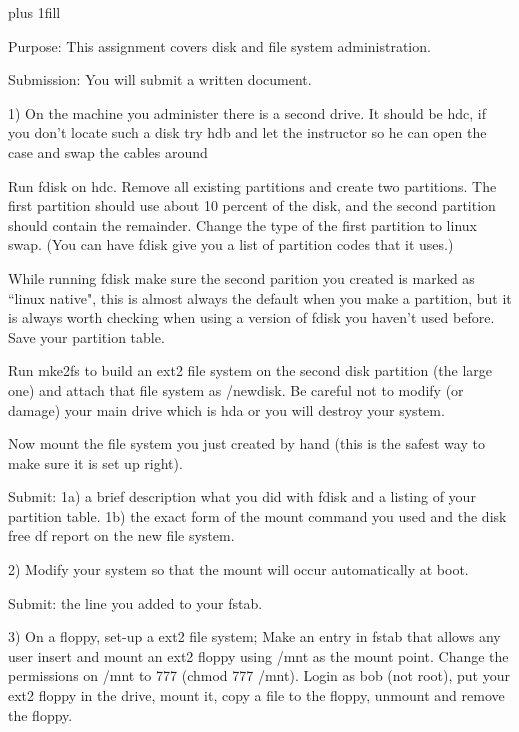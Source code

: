 
\rightskip=0pt plus 1fill

\parindent 0pt

Purpose: This assignment covers disk and file system administration.

Submission: You will submit a written document.

1) On the machine you administer there is a second drive.
It should be {\ltt{}hdc}, if you don't locate such a disk
try {\ltt{}hdb} and let the instructor so he can
open the case and swap the cables around

Run {\ltt{}fdisk} on {\ltt{}hdc}.
Remove all existing partitions and create two partitions.
The first partition should use about 10 percent of the
disk, and the second partition should contain the remainder.
Change the type of the first partition to linux swap.
(You can have {\ltt{}fdisk} give you a list of partition codes that it uses.)

While running {\ltt{}fdisk} make sure the second parition
you created is marked as ``linux native", this is almost always the
default when you make a partition, but it is always worth checking
when using a version of {\ltt{}fdisk} you haven't used before.
Save your partition table.

Run {\ltt{}mke2fs} to build 
an ext2 file system on the second disk partition (the large
one) and attach that file system as {\ltt{}/newdisk}.
Be careful not to modify (or damage) your main drive
which is {\ltt{}hda} or you will destroy your system.

Now mount the file system you just created by hand
(this is the safest way to make sure it is set up right).

Submit: 
1a) a brief description what you did with {\ltt{}fdisk} and
a listing of your partition table.
1b) the exact form of the {\ltt{}mount} command you used and
the disk free {\ltt{}df} report on the new file system.

2) Modify your system so that the mount will 
occur automatically at boot.

Submit: the line you added to your {\ltt{}fstab}.

3) On a floppy, set-up a ext2 file system;
Make an entry in {\ltt{}fstab} that allows any user insert and 
mount an ext2 floppy using {\ltt{}/mnt} as the mount point.
Change the permissions on {\ltt{}/mnt} to 777 ({\ltt{}chmod 777 /mnt}).
Login as bob (not root), put your ext2 floppy
in the drive,
mount it, copy a file to the floppy, unmount and remove the floppy.

